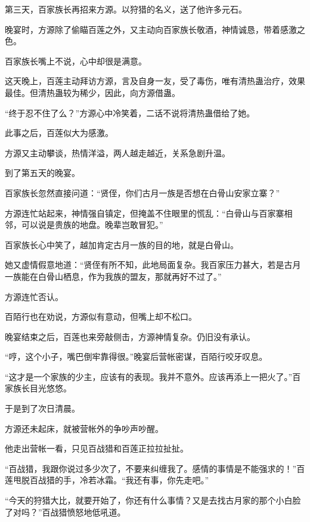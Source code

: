 
\begin{this_body}



第三天，百家族长再招来方源。以狩猎的名义，送了他许多元石。

晚宴时，方源除了偷瞄百莲之外，又主动向百家族长敬酒，神情诚恳，带着感激之色。

百家族长嘴上不说，心中却很是满意。

这天晚上，百莲主动拜访方源，言及自身一友，受了毒伤，唯有清热蛊治疗，效果最佳。但清热蛊较为稀少，因此，向方源借蛊。

“终于忍不住了么？”方源心中冷笑着，二话不说将清热蛊借给了她。

此事之后，百莲似大为感激。

方源又主动攀谈，热情洋溢，两人越走越近，关系急剧升温。

到了第五天的晚宴。

百家族长忽然直接问道：“贤侄，你们古月一族是否想在白骨山安家立寨？”

方源连忙站起来，神情强自镇定，但掩盖不住眼里的慌乱：“白骨山与百家寨相邻，可以说是贵族的地盘。晚辈岂敢冒犯。”

百家族长心中笑了，越加肯定古月一族的目的地，就是白骨山。

她又虚情假意地道：“贤侄有所不知，此地局面复杂。我百家压力甚大，若是古月一族能在白骨山栖息，作为我族的盟友，那就再好不过了。”

方源连忙否认。

百陌行也在劝说，方源似有意动，但嘴上却不松口。

晚宴结束之后，百莲也来旁敲侧击，方源神情复杂。仍旧没有承认。

“哼，这个小子，嘴巴倒牢靠得很。”晚宴后营帐密谋，百陌行咬牙叹息。

“这才是一个家族的少主，应该有的表现。我并不意外。应该再添上一把火了。”百家族长目光悠悠。

于是到了次日清晨。

方源还未起床，就被营帐外的争吵声吵醒。

他走出营帐一看，只见百战猎和百莲正拉拉扯扯。

“百战猎，我跟你说过多少次了，不要来纠缠我了。感情的事情是不能强求的！”百莲甩脱百战猎的手，冷若冰霜。“我还有事，你先走吧。”

“今天的狩猎大比，就要开始了，你还有什么事情？又是去找古月家的那个小白脸了对吗？”百战猎愤怒地低吼道。


\end{this_body}
